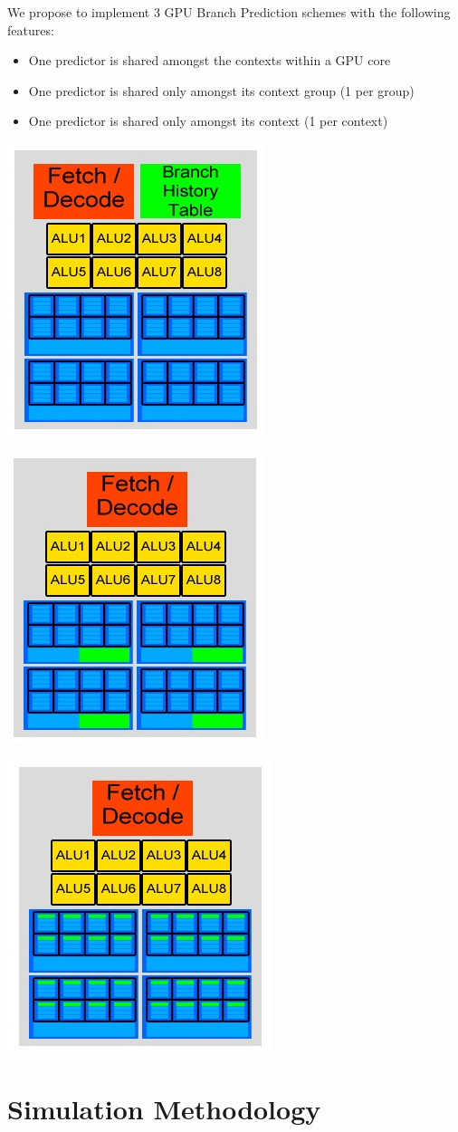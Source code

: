 \documentclass[conference]{IEEEtran}
\begin{document}
We propose to implement 3 GPU Branch Prediction schemes with the following features:
\begin{itemize}
	\item One predictor is shared amongst the contexts within a GPU core
	\item One predictor is shared only amongst its context group (1 per group)
	\item One predictor is shared only amongst its context (1 per context)
\end{itemize}


\begin{center}
	\includegraphics[width=.2\textwidth]{Our-GPU---per-core-predictor.jpg}
\end{center}

\begin{center}
	\includegraphics[width=.2\textwidth]{Our-GPU---per-context-group-predictor.jpg}
\end{center}

\begin{center}
	\includegraphics[width=.2\textwidth]{Our-GPU---per-element-predictor.jpg}
\end{center}


\section{Simulation Methodology}
\end{document}
